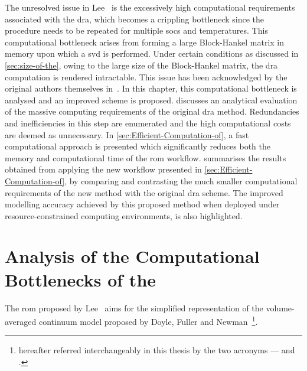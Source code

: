 The  unresolved  issue in  Lee~\etal{}  is  the excessively  high  computational
requirements associated with the \gls{dra}, which becomes a crippling bottleneck
since  the  procedure  needs  to   be  repeated  for  multiple  \glspl{soc}  and
temperatures.  This  computational  bottleneck   arises  from  forming  a  large
Block-Hankel  matrix  in memory  upon  which  a  \gls{svd} is  performed.  Under
certain conditions  as discussed in  \cref{sec:size-of-the}, owing to  the large
size  of  the  Block-Hankel  matrix,   the  \gls{dra}  computation  is  rendered
intractable. This issue has been acknowledged by the original authors themselves
in~\cite{Lee2012,Plett2015}.  In  this  chapter, this  computational  bottleneck
is  analysed  and an  improved  scheme  is proposed.  
discusses an analytical evaluation of  the massive computing requirements of the
original  \gls{dra} method.  Redundancies and  inefficiencies in  this step  are
enumerated  and the  high  computational  costs are  deemed  as unnecessary.  In
\cref{sec:Efficient-Computation-of}, a fast  computational approach is presented
which  significantly reduces  both  the  memory and  computational  time of  the
\gls{rom}  workflow.   summarises  the  results obtained  from
applying the  new workflow presented in  \cref{sec:Efficient-Computation-of}, by
comparing and contrasting the much smaller computational requirements of the new
method  with the  original  \gls{dra} scheme.  The  improved modelling  accuracy
achieved  by  this  proposed  method when  deployed  under  resource-constrained
computing environments, is also highlighted.

\section{Analysis of the Computational Bottlenecks of the }\label{sec:Analysis-of-the}

The \gls{rom}  proposed by  Lee~\etal{} aims  for the  simplified representation
of  the    volume-averaged  continuum  model  proposed  by  Doyle,
Fuller   and   Newman~\cite{Doyle1993a,Fuller1994}\footnote{hereafter   referred
    interchangeably in  this thesis  by the two  acronyms ---   and
.}.


